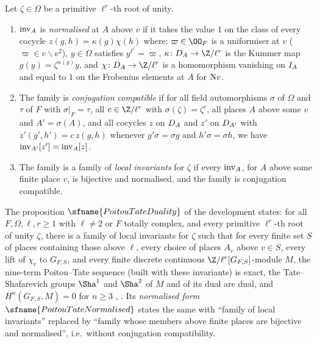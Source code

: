 \begin{definition}\label{pf:sh-hodge:def-inv}
Let $\zeta\in\Omega$ be a primitive $\ell^r$-th root of unity.
\begin{enumerate}[label=(\alph*)]
\item $\operatorname{inv}_A$ is \emph{normalised} at $A$ above $v$ if it takes the value $1$ on the class of every cocycle
  $z(g,h)=\kappa(g)\chi(h)$ where: $\varpi\in\OO_F$ is a uniformiser at $v$ ($\varpi\in v\smallsetminus v^2$), $y\in\Omega$ satisfies
  $y^{\ell^r}=\varpi$, $\kappa\colon\shhodgeDec_A\to\Z/\ell^r$ is the Kummer map $g(y)=\zeta^{\kappa(g)}y$, and $\chi\colon
  \shhodgeDec_A\to\Z/\ell^r$ is a homomorphism vanishing on $I_A$ and equal to $1$ on the Frobenius elements at $A$ for
  $\mathrm{N} v$.
\item The family is \emph{conjugation compatible} if for all field automorphisms $\sigma$ of $\Omega$ and $\tau$ of $F$ with
  $\sigma|_F=\tau$, all $c\in\Z/\ell^r$ with $\sigma(\zeta)=\zeta^c$, all places $A$ above some $v$ and $A'=\sigma(A)$, and all cocycles $z$
  on $D_A$ and $z'$ on $D_{A'}$ with $z'(g',h')=c\,z(g,h)$ whenever $g'\sigma=\sigma g$ and $h'\sigma=\sigma h$, we have
  $\operatorname{inv}_{A'}[z']=\operatorname{inv}_A[z]$.
\item The family is a family of \emph{local invariants} for $\zeta$ if every $\operatorname{inv}_A$, for $A$ above some finite place $v$,
  is bijective and normalised, and the family is conjugation compatible.
\end{enumerate}
\end{definition}

The proposition $\sfname{PoitouTateDuality}$ of the development states: for all $F,\Omega,\ell,r\ge1$ with $\ell\ne2$ or $F$
totally complex, and every primitive $\ell^r$-th root of unity $\zeta$, there is a family of local invariants for $\zeta$ such that
for every finite set $S$ of places containing those above $\ell$, every choice of places $A_v$ above $v\in S$, every lift of $\chi_r$
to $G_{F,S}$, and every finite discrete continuous $\Z/\ell^r[G_{F,S}]$-module $M$, the nine-term Poitou--Tate sequence (built with
these invariants) is exact, the Tate--Shafarevich groups $\Sha^1$ and $\Sha^2$ of $M$ and of its dual are dual, and
$H^n(G_{F,S},M)=0$ for $n\ge3$ \cite[Ch.~I, Thm.~4.10]{Milne2006}, \cite[Ch.~VIII, \S6]{NeukirchSchmidtWingberg2008}. Its
\emph{normalised form} $\sfname{PoitouTateNormalised}$ states the same with ``family of local invariants'' replaced by ``family
whose members above finite places are bijective and normalised'', i.e.\ without conjugation compatibility.

